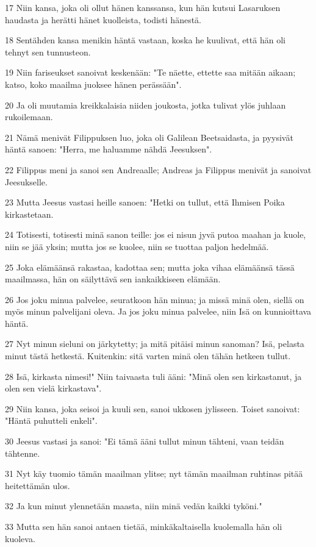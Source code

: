 \par 17 Niin kansa, joka oli ollut hänen kanssansa, kun hän kutsui Lasaruksen haudasta ja herätti hänet kuolleista, todisti hänestä.
\par 18 Sentähden kansa menikin häntä vastaan, koska he kuulivat, että hän oli tehnyt sen tunnusteon.
\par 19 Niin fariseukset sanoivat keskenään: "Te näette, ettette saa mitään aikaan; katso, koko maailma juoksee hänen perässään".
\par 20 Ja oli muutamia kreikkalaisia niiden joukosta, jotka tulivat ylös juhlaan rukoilemaan.
\par 21 Nämä menivät Filippuksen luo, joka oli Galilean Beetsaidasta, ja pyysivät häntä sanoen: "Herra, me haluamme nähdä Jeesuksen".
\par 22 Filippus meni ja sanoi sen Andreaalle; Andreas ja Filippus menivät ja sanoivat Jeesukselle.
\par 23 Mutta Jeesus vastasi heille sanoen: "Hetki on tullut, että Ihmisen Poika kirkastetaan.
\par 24 Totisesti, totisesti minä sanon teille: jos ei nisun jyvä putoa maahan ja kuole, niin se jää yksin; mutta jos se kuolee, niin se tuottaa paljon hedelmää.
\par 25 Joka elämäänsä rakastaa, kadottaa sen; mutta joka vihaa elämäänsä tässä maailmassa, hän on säilyttävä sen iankaikkiseen elämään.
\par 26 Jos joku minua palvelee, seuratkoon hän minua; ja missä minä olen, siellä on myös minun palvelijani oleva. Ja jos joku minua palvelee, niin Isä on kunnioittava häntä.
\par 27 Nyt minun sieluni on järkytetty; ja mitä pitäisi minun sanoman? Isä, pelasta minut tästä hetkestä. Kuitenkin: sitä varten minä olen tähän hetkeen tullut.
\par 28 Isä, kirkasta nimesi!" Niin taivaasta tuli ääni: "Minä olen sen kirkastanut, ja olen sen vielä kirkastava".
\par 29 Niin kansa, joka seisoi ja kuuli sen, sanoi ukkosen jylisseen. Toiset sanoivat: "Häntä puhutteli enkeli".
\par 30 Jeesus vastasi ja sanoi: "Ei tämä ääni tullut minun tähteni, vaan teidän tähtenne.
\par 31 Nyt käy tuomio tämän maailman ylitse; nyt tämän maailman ruhtinas pitää heitettämän ulos.
\par 32 Ja kun minut ylennetään maasta, niin minä vedän kaikki tyköni."
\par 33 Mutta sen hän sanoi antaen tietää, minkäkaltaisella kuolemalla hän oli kuoleva.
